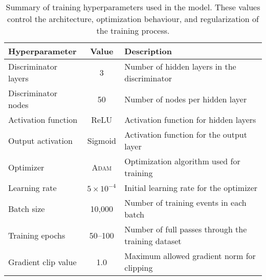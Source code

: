 \begin{table}
\centering
\begin{tabular}{|l|c|p{8cm}|}
\hline
\textbf{Hyperparameter} & \textbf{Value} & \textbf{Description} \\
\hline
Discriminator layers     & 3             & Number of hidden layers in the discriminator \\
Discriminator nodes      & 50            & Number of nodes per hidden layer \\
Activation function      & ReLU          & Activation function for hidden layers \\
Output activation        & Sigmoid       & Activation function for the output layer \\
Optimizer                & \textsc{Adam}          & Optimization algorithm used for training \\
Learning rate            & $5 \times 10^{-4}$ & Initial learning rate for the optimizer \\
Batch size              & 10,000        & Number of training events in each batch \\
Training epochs          & 50--100       & Number of full passes through the training dataset \\
Gradient clip value      & 1.0           & Maximum allowed gradient norm for clipping \\
\hline
\end{tabular}
\caption{Summary of training hyperparameters used in the model.
%
These values control the architecture, optimization behaviour, and regularization of the training process.}
\label{tab:moment-unfolding-hyperparams}
\end{table}